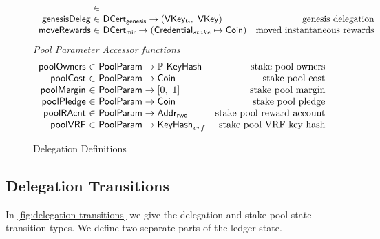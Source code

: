 \begin{figure}[htb]
\begin{equation*}
\begin{array}{r@{~\in~}lr}
      \\
      \fun{genesisDeleg} & \DCertGen \to (\VKeyGen,~\VKey)
                                            & \text{genesis delegation}
      \\
      \fun{moveRewards} & \DCertMir \to (\StakeCredential \mapsto \Coin)
                                            & \text{moved instantaneous rewards}
    \end{array}
  \end{equation*}
  \emph{Pool Parameter Accessor functions}
  \begin{equation*}
  \begin{array}{r@{~\in~}lr}
    \fun{poolOwners} & \PoolParam \to \powerset{\KeyHash}
                     & \text{stake pool owners}
    \\
    \fun{poolCost} & \PoolParam \to \Coin
                     & \text{stake pool cost}
    \\
    \fun{poolMargin} & \PoolParam \to \unitInterval
                     & \text{stake pool margin}
    \\
    \fun{poolPledge} & \PoolParam \to \Coin
                     & \text{stake pool pledge}
    \\
    \fun{poolRAcnt} & \PoolParam \to \AddrRWD
                     & \text{stake pool reward account}
    \\
    \fun{poolVRF} & \PoolParam \to \KeyHash_{vrf}
                  & \text{stake pool VRF key hash}
    \\
  \end{array}
  \end{equation*}

  \caption{Delegation Definitions}
  \label{fig:delegation-defs}
\end{figure}

\clearpage

\subsection{Delegation Transitions}
\label{sec:deleg-trans}


In \cref{fig:delegation-transitions} we give the delegation and stake pool
state transition types. We define two separate parts of the ledger state.

